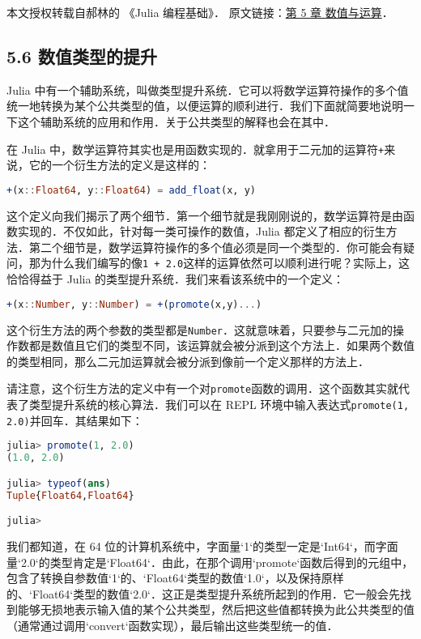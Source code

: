 
本文授权转载自郝林的 《Julia 编程基础》． 原文链接：\href{https://github.com/hyper0x/JuliaBasics/blob/master/book/ch05.md}{第 5 章 数值与运算}．


\subsection{5.6 数值类型的提升}

Julia 中有一个辅助系统，叫做类型提升系统．它可以将数学运算符操作的多个值统一地转换为某个公共类型的值，以便运算的顺利进行．我们下面就简要地说明一下这个辅助系统的应用和作用．关于公共类型的解释也会在其中．

在 Julia 中，数学运算符其实也是用函数实现的．就拿用于二元加的运算符\verb|+|来说，它的一个衍生方法的定义是这样的：
\begin{lstlisting}[language=julia]
+(x::Float64, y::Float64) = add_float(x, y)
\end{lstlisting}

这个定义向我们揭示了两个细节．第一个细节就是我刚刚说的，数学运算符是由函数实现的．不仅如此，针对每一类可操作的数值，Julia 都定义了相应的衍生方法．第二个细节是，数学运算符操作的多个值必须是同一个类型的．你可能会有疑问，那为什么我们编写的像\verb|1 + 2.0|这样的运算依然可以顺利进行呢？实际上，这恰恰得益于 Julia 的类型提升系统．我们来看该系统中的一个定义：
\begin{lstlisting}[language=julia]
+(x::Number, y::Number) = +(promote(x,y)...)
\end{lstlisting}

这个衍生方法的两个参数的类型都是\verb|Number|．这就意味着，只要参与二元加的操作数都是数值且它们的类型不同，该运算就会被分派到这个方法上．如果两个数值的类型相同，那么二元加运算就会被分派到像前一个定义那样的方法上．

请注意，这个衍生方法的定义中有一个对\verb|promote|函数的调用．这个函数其实就代表了类型提升系统的核心算法．我们可以在 REPL 环境中输入表达式\verb|promote(1, 2.0)|并回车．其结果如下：
\begin{lstlisting}[language=julia]
julia> promote(1, 2.0)
(1.0, 2.0)

julia> typeof(ans)
Tuple{Float64,Float64}

julia> 
\end{lstlisting}

我们都知道，在 64 位的计算机系统中，字面量`1`的类型一定是`Int64`，而字面量`2.0`的类型肯定是`Float64`．由此，在那个调用`promote`函数后得到的元组中，包含了转换自参数值`1`的、`Float64`类型的数值`1.0`，以及保持原样的、`Float64`类型的数值`2.0`．这正是类型提升系统所起到的作用．它一般会先找到能够无损地表示输入值的某个公共类型，然后把这些值都转换为此公共类型的值（通常通过调用`convert`函数实现），最后输出这些类型统一的值．

